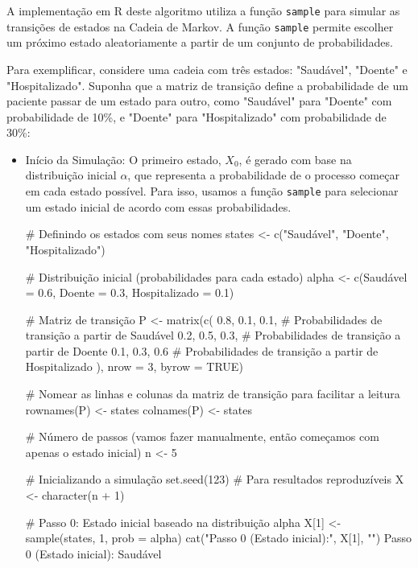 \documentclass[12pt, a4paper, openany]{book}
\numberwithin{equation}{chapter}
\numberwithin{table}{chapter}
\numberwithin{figure}{chapter}
\theoremstyle{break}
\begin{document}
A implementação em R deste algoritmo utiliza a função \texttt{sample} para simular as transições de estados na Cadeia de Markov. A função \texttt{sample} permite escolher um próximo estado aleatoriamente a partir de um conjunto de probabilidades.


Para exemplificar, considere uma cadeia com três estados: "Saudável", "Doente" e "Hospitalizado". Suponha que a matriz de transição define a probabilidade de um paciente passar de um estado para outro, como "Saudável" para "Doente" com probabilidade de 10\%, e "Doente" para "Hospitalizado" com probabilidade de 30\%:


\begin{itemize}
    \item Início da Simulação: O primeiro estado, \( X_0 \), é gerado com base na distribuição inicial \( \alpha \), que representa a probabilidade de o processo começar em cada estado possível. Para isso, usamos a função \texttt{sample} para selecionar um estado inicial de acordo com essas probabilidades.




\begin{RCodeBox}
# Definindo os estados com seus nomes
states <- c("Saudável", "Doente", "Hospitalizado")

# Distribuição inicial (probabilidades para cada estado)
alpha <- c(Saudável = 0.6, Doente = 0.3, Hospitalizado = 0.1)

# Matriz de transição
P <- matrix(c(
  0.8, 0.1, 0.1,   # Probabilidades de transição a partir de Saudável
  0.2, 0.5, 0.3,   # Probabilidades de transição a partir de Doente
  0.1, 0.3, 0.6    # Probabilidades de transição a partir de Hospitalizado
), nrow = 3, byrow = TRUE)

# Nomear as linhas e colunas da matriz de transição para facilitar a leitura
rownames(P) <- states
colnames(P) <- states

# Número de passos (vamos fazer manualmente, então começamos com apenas o estado inicial)
n <- 5

# Inicializando a simulação
set.seed(123)  # Para resultados reproduzíveis
X <- character(n + 1)

# Passo 0: Estado inicial baseado na distribuição alpha
X[1] <- sample(states, 1, prob = alpha)
cat("Passo 0 (Estado inicial):", X[1], "\n")
Passo 0 (Estado inicial): Saudável 
\end{RCodeBox}




\end{itemize}
\end{document}

